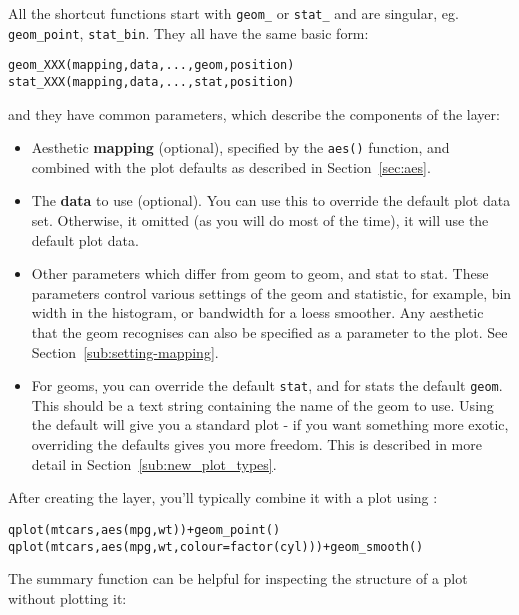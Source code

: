 All the shortcut functions start with {\tt geom\_} or {\tt stat\_} and are singular, eg. {\tt geom\_point}, {\tt stat\_bin}.  They all have the same  basic form:

\begin{alltt}
geom_XXX(mapping, data, ..., geom, position)
stat_XXX(mapping, data, ..., stat, position)
\end{alltt}

\noindent and they have common parameters, which describe the components of the layer:

\begin{itemize}
	\item Aesthetic {\bf mapping} (optional), specified by the {\tt aes()} function, and combined with the plot defaults as described in Section~\ref{sec:aes}.

	\item The {\bf data} to use (optional).  You can use this to override the default plot data set.  Otherwise, it omitted  (as you will do most of the time), it will use the default plot data.
	
	\item Other parameters which differ from geom to geom, and stat to stat.  These parameters control various settings of the geom and statistic, for example, bin width in the histogram, or bandwidth for a loess smoother.  Any aesthetic that the geom recognises can also be specified as a parameter to the plot.  See Section~\ref{sub:setting-mapping}.
	
	\item For geoms, you can override the default {\tt stat}, and for stats the default {\tt geom}.  This should be a text string containing the name of the geom to use.  Using the default will give you a standard plot - if you want something more exotic, overriding the defaults gives you more freedom.  This is described in more detail in Section~\ref{sub:new_plot_types}.
  
\end{itemize}

After creating the layer, you'll typically combine it with a plot using  \code{+}:

\begin{alltt}
  qplot(mtcars, aes(mpg, wt)) + geom_point()
  qplot(mtcars, aes(mpg, wt, colour = factor(cyl))) + geom_smooth()
\end{alltt}

\noindent The summary function can be helpful for inspecting the structure of a plot without plotting it:

